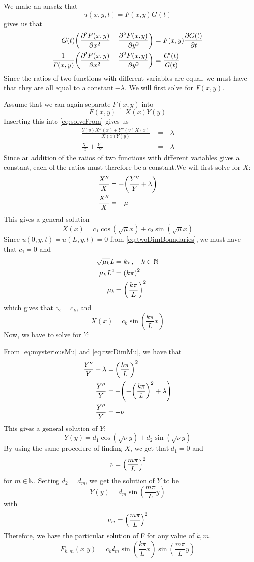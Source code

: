 \documentclass[12pt,english,a4paper]{article}
\begin{document}
We make an ansatz that
\[
u(x,y,t) = F(x,y)G(t)
\]
 gives us that
\begin{align}
G(t)\qty(\pdv[2]{F(x,y)}{x}+ \pdv[2]{F(x,y)}{y} ) &= F(x,y)\pdv{G(t)}{t} \nonumber\\
\frac{1}{F(x,y)}\qty(\pdv[2]{F(x,y)}{x}+ \pdv[2]{F(x,y)}{y} ) &= \frac{G'(t)}{G(t)} \label{eq:solveFrom}
\end{align}
Since the ratios of two functions with different variables are equal, we must have that they are all equal to a constant \(-\lambda\). We will first solve for \(F(x,y)\).

Assume that we can again separate \(F(x,y)\) into
\[
F(x,y) = X(x)Y(y)
\]
Inserting this into \vref{eq:solveFrom} gives us
\begin{align*}
\frac{Y(y)X''(x)+ Y''(y)X(x)}{X(x)Y(y)} &= -\lambda \\
\frac{X''}{X}+ \frac{Y''}{Y} &= -\lambda
\end{align*}
Since an addition of the ratios of two functions with different variables gives a constant, each of the ratios must therefore be a constant.We will first solve for \(X\):
\begin{align}
\frac{X''}{X} &= -\qty(\frac{Y''}{Y} +\lambda) \label{eq:mysteriousMu}\\
\frac{X''}{X} &= -\mu \nonumber
\end{align}
This gives a general solution
\[
X(x) = c_1\cos(\sqrt{\mu}x) + c_2\sin(\sqrt{\mu}x)
\]
Since \(u(0,y,t) = u(L,y,t) = 0\) from \vref{eq:twoDimBoundaries}, we must have that \(c_1 = 0\) and
\begin{align}
\sqrt{\mu_k}L &= k\pi \nonumber , \quad k \in \mathbb{N}\\
\mu_k L^2 &= \qty(k\pi)^2 \nonumber \\
 \mu_k  &=\qty(\frac{k\pi}{L})^2 \label{eq:twoDimMu}
\end{align}
which gives that \(c_2 = c_k\), and
\[
X(x) = c_k\sin(\frac{k\pi}{L}x)
\]
Now, we have to solve for \(Y\):

From \vref{eq:mysteriousMu} and \vref{eq:twoDimMu}, we have that
\begin{align*}
\frac{Y''}{Y} +\lambda  &=\qty(\frac{k\pi}{L})^2 \\
\frac{Y''}{Y}&=-\qty(-\qty(\frac{k\pi}{L})^2 + \lambda ) \\
\frac{Y''}{Y}&=-\nu
\end{align*}
This gives a general solution of \(Y\):
\[
Y(y) = d_1\cos(\sqrt{\nu}y) + d_2\sin(\sqrt{\nu}y)
\]
By using the same procedure of finding \(X\), we get that \(d_1 = 0\) and
\[
\nu = \qty(\frac{m\pi}{L})^2
\]
for \(m \in \mathbb{N}\). Setting \(d_2 = d_m\), we get the solution of \(Y\) to be
\[
Y(y) = d_m\sin(\frac{m\pi}{L}y)
\]
with
\begin{equation}\label{eq:notSoMysteriousNu}
\nu_m = \qty(\frac{m\pi}{L})^2
\end{equation}
Therefore, we have the particular solution of F for any value of \(k,m\).
\[
F_{k,m}(x,y) = c_kd_m\sin(\frac{k\pi}{L}x)\sin(\frac{m\pi}{L}y)
\]
\end{document}
